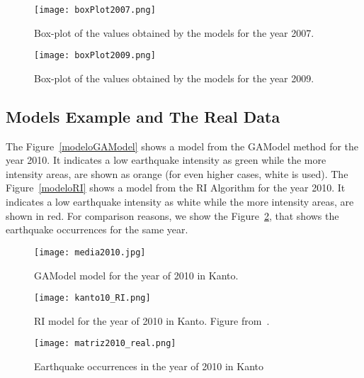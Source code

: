 \begin{figure}[H]
	\centering
	\begin{minipage}{0.45\textwidth}
		\centering
		\texttt{[image: boxPlot2007.png]}
		\caption{Box-plot of the values obtained by the models for the year 2007.}
		\label{boxPlot2007}
	\end{minipage}\hfill
	\begin{minipage}{0.45\textwidth}
		\centering
		\texttt{[image: boxPlot2009.png]}
		\caption{Box-plot of the values obtained by the models for the year 2009.}
		\label{boxPlot2009}
	\end{minipage}
\end{figure}

\subsection{Models Example and The Real Data}

The Figure~\ref{modeloGAModel} shows a model from the GAModel method for the year 2010. It indicates a low earthquake intensity as green while the more intensity areas, are shown as orange (for even higher cases, white is used). The Figure~\ref{modeloRI} shows a model from the RI Algorithm for the year 2010. It indicates a low earthquake intensity as white while the more intensity areas, are shown in red. For comparison reasons, we show the Figure~\ref{realData}, that shows the earthquake occurrences for the same year.\\


\begin{figure}[H]
	\centering
	\begin{minipage}{0.45\textwidth}
		\centering
		\texttt{[image: media2010.jpg]}
		\caption{ GAModel model for the year of 2010 in Kanto.}
		\label{modeloGAModel}
	\end{minipage}\hfill
	\begin{minipage}{0.45\textwidth}
		\centering
			\texttt{[image: kanto10\_RI.png]}
			\caption{RI model for the year of 2010 in Kanto. Figure from~\cite{ecta14}.}
			\label{modeloRI}
	\end{minipage}
	\begin{minipage}{0.45\textwidth}
		\centering
		\texttt{[image: matriz2010\_real.png]}
		\caption{Earthquake occurrences in the year of 2010 in Kanto}
		\label{realData}
	\end{minipage}
\end{figure}


